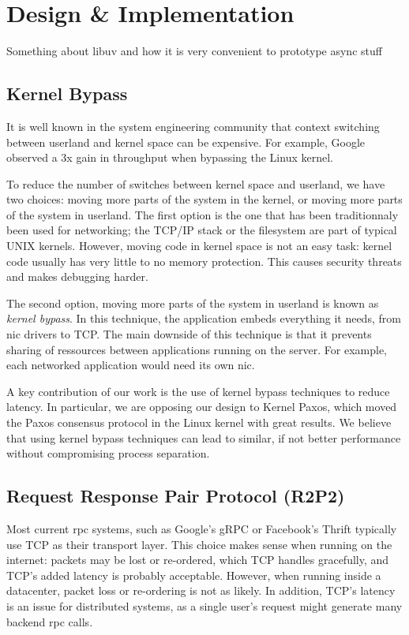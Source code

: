 \chapter{Design \& Implementation}

Something about libuv and how it is very convenient to prototype async stuff

\section{Kernel Bypass}

It is well known in the system engineering community that context switching between userland and kernel space can be expensive.
For example, Google observed a 3x gain in throughput when bypassing the Linux kernel\cite{maglev}.

To reduce the number of switches between kernel space and userland, we have two choices: moving more parts of the system in the kernel, or moving more parts of the system in userland.
The first option is the one that has been traditionnaly been used for networking; the TCP/IP stack or the filesystem are part of typical UNIX kernels.
However, moving code in kernel space is not an easy task: kernel code usually has very little to no memory protection.
This causes security threats and makes debugging harder.

The second option, moving more parts of the system in userland is known as \emph{kernel bypass}.
In this technique, the application embeds everything it needs, from \gls{nic} drivers to TCP.
The main downside of this technique is that it prevents sharing of ressources between applications running on the server.
For example, each networked application would need its own \gls{nic}.

A key contribution of our work is the use of kernel bypass techniques to reduce latency.
In particular, we are opposing our design to Kernel Paxos\cite{kernelpaxos}, which moved the Paxos consensus protocol in the Linux kernel with great results.
We believe that using kernel bypass techniques can lead to similar, if not better performance without compromising process separation. 

\section{Request Response Pair Protocol (R2P2)}

Most current \gls{rpc} systems, such as Google's gRPC\cite{grpc} or Facebook's Thrift\cite{thrift} typically use TCP as their transport layer.
This choice makes sense when running on the internet: packets may be lost or re-ordered, which TCP handles gracefully, and TCP's added latency is probably acceptable.
However, when running inside a datacenter, packet loss or re-ordering is not as likely.
In addition, TCP's latency is an issue for distributed systems, as a single user's request might generate many backend \gls{rpc} calls.

